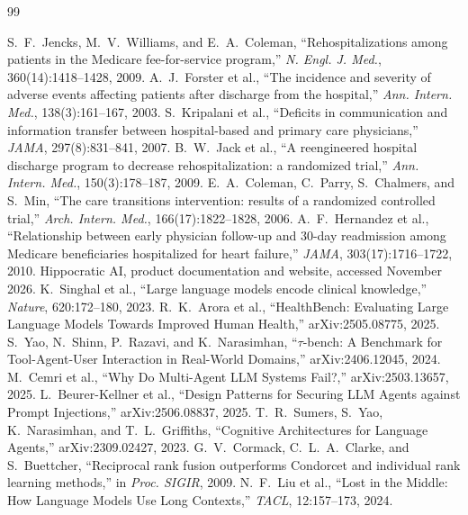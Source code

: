 \documentclass[10pt,a4paper]{article}
\begin{document}
\FloatBarrier
\label{sec:refs}
\begingroup
\footnotesize
\setlength{\parskip}{0pt}
\begin{thebibliography}{99}
\setlength{\itemsep}{1pt}
\setlength{\parsep}{0pt}

 S.~F.~Jencks, M.~V.~Williams, and E.~A.~Coleman, ``Rehospitalizations among patients in the Medicare fee-for-service program,'' \emph{N. Engl. J. Med.}, 360(14):1418--1428, 2009.
 A.~J.~Forster et al., ``The incidence and severity of adverse events affecting patients after discharge from the hospital,'' \emph{Ann. Intern. Med.}, 138(3):161--167, 2003.
 S.~Kripalani et al., ``Deficits in communication and information transfer between hospital-based and primary care physicians,'' \emph{JAMA}, 297(8):831--841, 2007.
 B.~W.~Jack et al., ``A reengineered hospital discharge program to decrease rehospitalization: a randomized trial,'' \emph{Ann. Intern. Med.}, 150(3):178--187, 2009.
 E.~A.~Coleman, C.~Parry, S.~Chalmers, and S.~Min, ``The care transitions intervention: results of a randomized controlled trial,'' \emph{Arch. Intern. Med.}, 166(17):1822--1828, 2006.
 A.~F.~Hernandez et al., ``Relationship between early physician follow-up and 30-day readmission among Medicare beneficiaries hospitalized for heart failure,'' \emph{JAMA}, 303(17):1716--1722, 2010.
 Hippocratic AI, product documentation and website, accessed November 2026.
 K.~Singhal et al., ``Large language models encode clinical knowledge,'' \emph{Nature}, 620:172--180, 2023.
 R.~K.~Arora et al., ``HealthBench: Evaluating Large Language Models Towards Improved Human Health,'' arXiv:2505.08775, 2025.
 S.~Yao, N.~Shinn, P.~Razavi, and K.~Narasimhan, ``$\tau$-bench: A Benchmark for Tool-Agent-User Interaction in Real-World Domains,'' arXiv:2406.12045, 2024.
 M.~Cemri et al., ``Why Do Multi-Agent LLM Systems Fail?,'' arXiv:2503.13657, 2025.
 L.~Beurer-Kellner et al., ``Design Patterns for Securing LLM Agents against Prompt Injections,'' arXiv:2506.08837, 2025.
 T.~R.~Sumers, S.~Yao, K.~Narasimhan, and T.~L.~Griffiths, ``Cognitive Architectures for Language Agents,'' arXiv:2309.02427, 2023.
 G.~V.~Cormack, C.~L.~A.~Clarke, and S.~Buettcher, ``Reciprocal rank fusion outperforms Condorcet and individual rank learning methods,'' in \emph{Proc. SIGIR}, 2009.
 N.~F.~Liu et al., ``Lost in the Middle: How Language Models Use Long Contexts,'' \emph{TACL}, 12:157--173, 2024.

\end{thebibliography}
\end{document}
